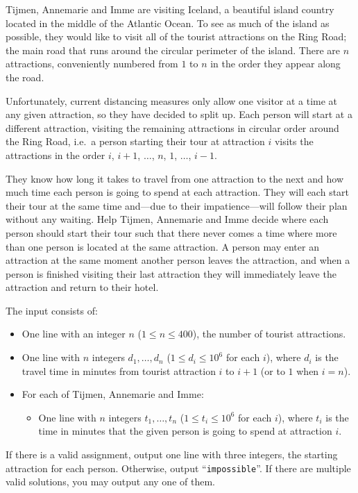 
%
Tijmen, Annemarie and Imme are visiting Iceland, a beautiful island country
located in the middle of the Atlantic Ocean. To see as much of the island as
possible, they would like to visit all of the tourist attractions on the Ring
Road; the main road that runs around the circular perimeter of the island.
There are $n$ attractions, conveniently numbered from $1$ to $n$ in the order
they appear along the road.

Unfortunately, current distancing measures only allow one visitor at a time at any
given attraction, so they have decided to split up. Each person will start at a
different attraction, visiting the remaining attractions in circular order
around the Ring Road, i.e.\ a person starting their tour at attraction $i$
visits the attractions in the order $i$, $i+1$, $\ldots$, $n$, $1$, $\ldots$,
$i-1$.

They know how long it takes to travel from one attraction to the next and how
much time each person is going to spend at each attraction. They will each
start their tour at the same time and---due to their impatience---will follow
their plan without any waiting. Help Tijmen, Annemarie and Imme decide where
each person should start their tour such that there never comes a time where more
than one person is located at the same attraction. A person may enter an
attraction at the same moment another person leaves the attraction, and when a
person is finished visiting their last attraction they will immediately leave
the attraction and return to their hotel.

\begin{Input}
The input consists of:
\begin{itemize}
  \item One line with an integer $n$ ($1 \le n  \le 400$), the number of tourist attractions.
  \item One line with $n$ integers $d_1,\ldots,d_n$ ($1 \le d_i \le 10^6$ for
      each $i$), where $d_i$ is the travel time in minutes from tourist attraction
        $i$ to $i+1$ (or to $1$ when $i = n$).
  \item For each of Tijmen, Annemarie and Imme:
      \begin{itemize}
          \item One line with $n$ integers $t_{1}, \ldots, t_{n}$ ($1 \le t_{i}
              \le 10^6$ for each $i$), where $t_i$ is the time in minutes that the given
              person is going to spend at attraction $i$.
      \end{itemize}
\end{itemize}
\end{Input}

\begin{Output}
If there is a valid assignment, output one line with three integers, the
starting attraction for each person.  Otherwise, output
``\texttt{impossible}''. If there are multiple valid solutions, you may
output any one of them.
\end{Output}
